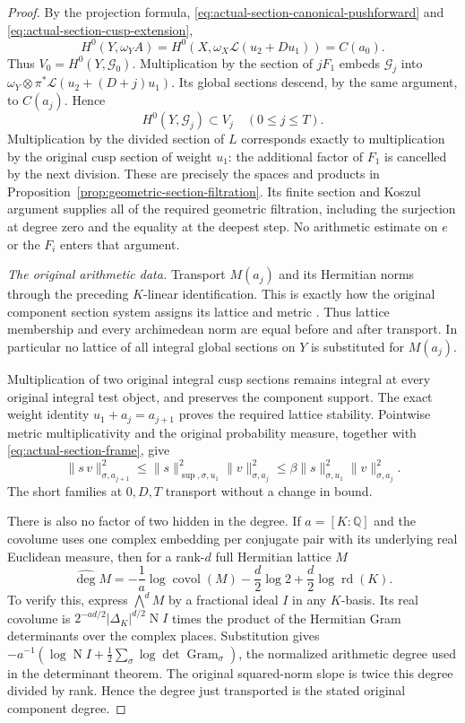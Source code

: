 \begin{proof}
By the projection formula, \eqref{eq:actual-section-canonical-pushforward}
and \eqref{eq:actual-section-cusp-extension},
\[
 H^0(Y,\omega_Y A)
   =H^0(X,\omega_X\mathcal L(u_2+Du_1))=C(a_0).
\]
Thus $V_0=H^0(Y,\mathcal G_0)$.  Multiplication by the section
of $jF_1$ embeds
$\mathcal G_j$ into
$\omega_Y\otimes\pi^*\mathcal L(u_2+(D+j)u_1)$.
Its global sections descend, by the same argument, to $C(a_j)$.
Hence
\[
                    H^0(Y,\mathcal G_j)\subset V_j
                         \quad(0\le j\le T).
\]
Multiplication by the divided section of $L$ corresponds exactly
to multiplication by the original cusp section of weight $u_1$:
the additional factor of $F_1$ is cancelled by the next division.
These are precisely the spaces and products in
Proposition~\ref{prop:geometric-section-filtration}.  Its finite
section and Koszul argument supplies all of the required geometric
filtration, including the surjection at degree zero and the equality
at the deepest step.  No arithmetic estimate on $e$ or the $F_i$
enters that argument.

\emph{The original arithmetic data.}
Transport $M(a_j)$ and its Hermitian norms through the preceding
$K$-linear identification.  This is exactly how the original
component section system assigns its lattice and metric
\cite{actual-section-source}.  Thus lattice membership and every
archimedean norm are equal before and after transport.
In particular no lattice of all integral global sections on $Y$
is substituted for $M(a_j)$.

Multiplication of two original integral cusp sections remains
integral at every original integral test object, and preserves the
component support.  The exact weight identity
$u_1+a_j=a_{j+1}$ proves the required lattice stability.
Pointwise metric multiplicativity and the original probability
measure, together with \eqref{eq:actual-section-frame}, give
\[
 \|s\,v\|_{\sigma,a_{j+1}}^2
   \le \|s\|_{\sup,\sigma,u_1}^2\|v\|_{\sigma,a_j}^2
   \le\beta\|s\|_{\sigma,u_1}^2\|v\|_{\sigma,a_j}^2.
\]
The short families at $0,D,T$ transport without a change in bound.

There is also no factor of two hidden in the degree.  If
$a=[K:\mathbb Q]$ and the covolume uses one complex embedding
per conjugate pair with its underlying real Euclidean measure,
then for a rank-$d$ full Hermitian lattice $M$
\[
 \widehat{\deg}M
   =-\frac1a\log\operatorname{covol}(M)
      -\frac d2\log2+\frac d2\log\operatorname{rd}(K).
\]
To verify this, express $\bigwedge^dM$ by a fractional ideal
$I$ in any $K$-basis.  Its real covolume is
$2^{-ad/2}|\Delta_K|^{d/2}\operatorname NI$
times the product of the Hermitian Gram determinants over the
complex places.  Substitution gives
$-a^{-1}(\log\operatorname NI+
\tfrac12\sum_\sigma\log\det\operatorname{Gram}_\sigma)$,
the normalized arithmetic degree used in the determinant theorem.
The original squared-norm slope is twice this degree divided by
rank.  Hence the degree just transported is the stated original
component degree.


\end{proof}
